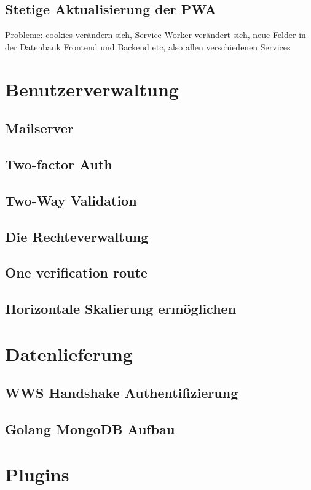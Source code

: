 \subsection{Stetige Aktualisierung der PWA}
Probleme: cookies verändern sich, Service Worker verändert sich, neue Felder in der Datenbank
Frontend und Backend etc, also allen verschiedenen Services

\section{Benutzerverwaltung}
\subsection{Mailserver}
\subsection{Two-factor Auth}
\subsection{Two-Way Validation}
\subsection{Die Rechteverwaltung}
\subsection{One verification route}
\subsection{Horizontale Skalierung ermöglichen}


\section{Datenlieferung}

\subsection{WWS Handshake Authentifizierung}
\subsection{Golang MongoDB Aufbau}

\section{Plugins}
